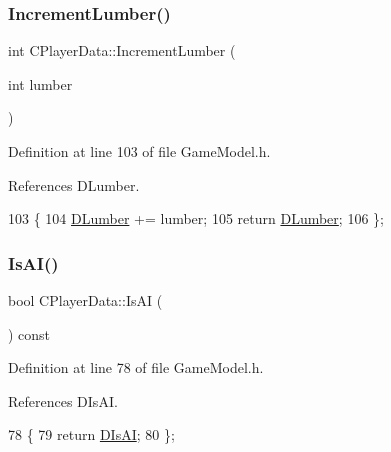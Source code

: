 \subsubsection{\texorpdfstring{Increment\+Lumber()}{IncrementLumber()}}
{\footnotesize\ttfamily int C\+Player\+Data\+::\+Increment\+Lumber (\begin{DoxyParamCaption}\item[{int}]{lumber }\end{DoxyParamCaption})\hspace{0.3cm}{\ttfamily [inline]}}



Definition at line 103 of file Game\+Model.\+h.



References D\+Lumber.


\begin{DoxyCode}
103                                        \{
104             \hyperlink{classCPlayerData_adf3bf2fa49b5c8a4fb9a478d95f688c4}{DLumber} += lumber;
105             \textcolor{keywordflow}{return} \hyperlink{classCPlayerData_adf3bf2fa49b5c8a4fb9a478d95f688c4}{DLumber};  
106         \};
\end{DoxyCode}
\hypertarget{classCPlayerData_ac68129067db822343e68b307de53e11c}{}\label{classCPlayerData_ac68129067db822343e68b307de53e11c} 
\subsubsection{\texorpdfstring{Is\+A\+I()}{IsAI()}\hspace{0.1cm}{\footnotesize\ttfamily [1/2]}}
{\footnotesize\ttfamily bool C\+Player\+Data\+::\+Is\+AI (\begin{DoxyParamCaption}{ }\end{DoxyParamCaption}) const\hspace{0.3cm}{\ttfamily [inline]}}



Definition at line 78 of file Game\+Model.\+h.



References D\+Is\+AI.


\begin{DoxyCode}
78                          \{
79             \textcolor{keywordflow}{return} \hyperlink{classCPlayerData_ad3fcb8740d4e37b4654c01c8c595e6d5}{DIsAI};
80         \};
\end{DoxyCode}
\hypertarget{classCPlayerData_a20d6aa66a3483ad16052b0afea928ec6}{}\label{classCPlayerData_a20d6aa66a3483ad16052b0afea928ec6} 
